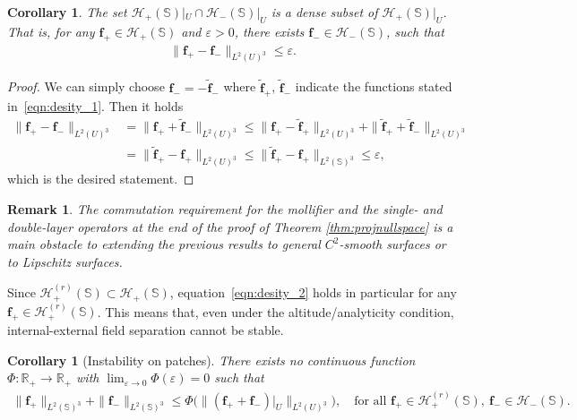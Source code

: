 \documentclass[a4paper, 11pt]{article}
\newtheorem{corollary}[theorem]{Corollary}
\newtheorem{remark}[theorem]{Remark}
\renewcommand{\SS}{\mathbb{S}}
\newcommand{\R}{\mathbb{R}}
\newcommand{\f}{\mathbf{f}}
\newcommand{\eps}{\varepsilon}
\begin{document}
\begin{corollary}\label{thm:instability}
The set $\mathcal H_+(\SS)|_{U} \cap \mathcal H_-(\SS)|_{U}$ is a dense subset of $\mathcal H_+(\SS)|_{U}$. That is, for any $\f_+\in\mathcal H_+(\SS)$ and $\eps>0$, there exists $\f_-\in \mathcal H_-(\SS)$, such that
  \begin{align}\label{eqn:desity_2}
      \|\f_+ - \f_-\|_{L^2(U)^3}\leq \eps.
  \end{align}
\end{corollary}
\begin{proof}
    We can simply choose $\f_-=-\tilde{\f}_-$ where $\tilde{\f}_+$, $\tilde{\f}_-$ indicate the functions stated in~\eqref{eqn:desity_1}. Then it holds 
    \begin{align*}
         \|\f_+ - \f_-\|_{L^2(U)^3}&=  \|\f_+ + \tilde{\f}_-\|_{L^2(U)^3} \leq \|\f_+ - \tilde{\f}_+\|_{L^2(U)^3} + \|\tilde{\f}_+ + \tilde{\f}_-\|_{L^2(U)^3}
         \\&=\|\tilde{\f}_+ - \f_+\|_{L^2(U)^3}\leq \|\tilde{\f}_+-\f_+\|_{L^2(\SS)^3}\leq \eps,
    \end{align*}
    which is the desired statement.
\end{proof}

\begin{remark}
    The commutation requirement for the mollifier and the single- and double-layer operators at the end of the proof of Theorem \ref{thm:projnullspace} is a main obstacle to extending the previous results to general $C^2$-smooth surfaces or to Lipschitz surfaces.
\end{remark}

Since $\mathcal H_+^{(r)}(\SS)\subset \mathcal H_+(\SS)$, equation~\eqref{eqn:desity_2} holds in particular for any $\f_+\in \mathcal H_+^{(r)}(\SS)$. This means that, even under the altitude/analyticity condition, internal-external field separation cannot be stable.

\begin{corollary}[Instability on patches]\label{thm:instabilityforHr}
There exists \emph{no} continuous function $\Phi:\R_+\to\R_+$ with $\lim_{\varepsilon\to 0}\Phi(\varepsilon)=0$ such that
\begin{align}
\|\f_+\|_{L^2(\SS)^3}+\|\f_-\|_{L^2(\SS)^3}
\le \Phi\Big(\|(\f_+ + \f_-)|_U\|_{L^2(U)^3}\Big),
\quad\text{for all }\f_+\in \mathcal H_+^{(r)}(\SS),\ \f_-\in \mathcal H_-(\SS).
\end{align}
\end{corollary}
\end{document}
